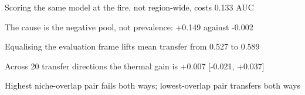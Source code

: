 \begin{highlights}
\item Scoring the same model at the fire, not region-wide, costs 0.133 AUC
\item The cause is the negative pool, not prevalence: +0.149 against -0.002
\item Equalising the evaluation frame lifts mean transfer from 0.527 to 0.589
\item Across 20 transfer directions the thermal gain is +0.007 [-0.021, +0.037]
\item Highest niche-overlap pair fails both ways; lowest-overlap pair transfers both ways
\end{highlights}
